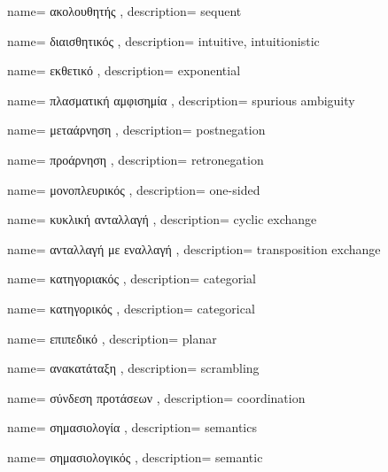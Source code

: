 {name={
ακολουθητής
},
description={
sequent
}}

{name={
διαισθητικός
},
description={
intuitive, intuitionistic
}}

{name={
εκθετικό
},
description={
exponential
}}

{name={
πλασματική αμφισημία
},
description={
spurious ambiguity
}}

{name={
μεταάρνηση
},
description={
postnegation
}}

{name={
προάρνηση
},
description={
retronegation
}}

{name={
μονοπλευρικός
},
description={
one-sided
}}

{name={
κυκλική ανταλλαγή
},
description={
cyclic exchange
}}

{name={
ανταλλαγή με εναλλαγή
},
description={
transposition exchange
}}

{name={
κατηγοριακός
},
description={
categorial
}}

{name={
κατηγορικός
},
description={
categorical
}}

{name={
επιπεδικό
},
description={
planar
}}

{name={
ανακατάταξη
},
description={
scrambling
}}

{name={
σύνδεση προτάσεων
},
description={
coordination
}}

{name={
σημασιολογία
},
description={
semantics
}}

{name={
σημασιολογικός
},
description={
semantic
}}



